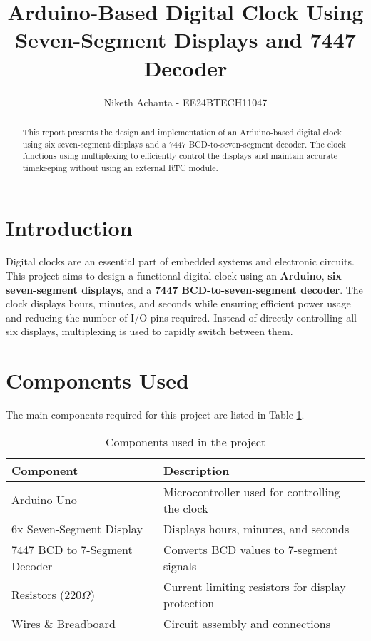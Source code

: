 \documentclass[a4paper,12pt]{article}
\title{\textbf{Arduino-Based Digital Clock Using Seven-Segment Displays and 7447 Decoder}}
\author{Niketh Achanta - EE24BTECH11047}
\date{}
\begin{document}
\maketitle

\begin{abstract}
This report presents the design and implementation of an Arduino-based digital clock using six seven-segment displays and a 7447 BCD-to-seven-segment decoder. The clock functions using multiplexing to efficiently control the displays and maintain accurate timekeeping without using an external RTC module.
\end{abstract}

\section{Introduction}
Digital clocks are an essential part of embedded systems and electronic circuits. This project aims to design a functional digital clock using an \textbf{Arduino}, \textbf{six seven-segment displays}, and a \textbf{7447 BCD-to-seven-segment decoder}. The clock displays hours, minutes, and seconds while ensuring efficient power usage and reducing the number of I/O pins required. Instead of directly controlling all six displays, multiplexing is used to rapidly switch between them.

\section{Components Used}
The main components required for this project are listed in Table \ref{tab:components}.

\begin{table}[h]
    \centering
    \renewcommand{\arraystretch}{1.2}
    \begin{tabular}{ll}
        \toprule
        \textbf{Component} & \textbf{Description} \\
        \midrule
        Arduino Uno & Microcontroller used for controlling the clock \\
        6x Seven-Segment Display & Displays hours, minutes, and seconds \\
        7447 BCD to 7-Segment Decoder & Converts BCD values to 7-segment signals \\
        Resistors (220$\Omega$) & Current limiting resistors for display protection \\
        Wires \& Breadboard & Circuit assembly and connections \\
        \bottomrule
    \end{tabular}
    \caption{Components used in the project}
    \label{tab:components}
\end{table}
\end{document}
